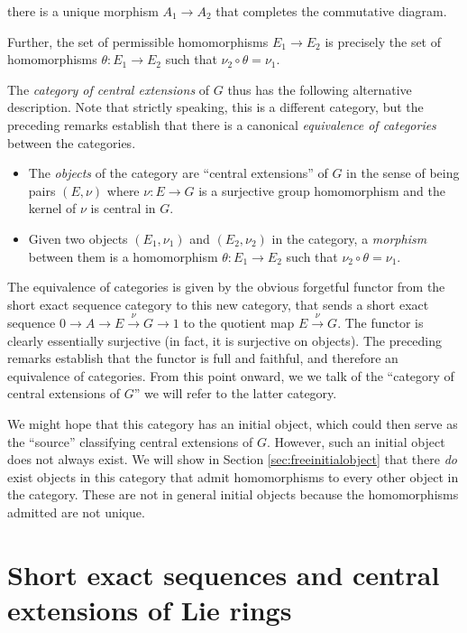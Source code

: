 there is a unique morphism $A_1 \to A_2$ that completes the
commutative diagram.

Further, the set of permissible homomorphisms
$E_1 \to E_2$ is precisely the set of homomorphisms $\theta: E_1 \to
E_2$ such that $\nu_2 \circ \theta = \nu_1$.

The {\em category of central extensions} of $G$ thus has the following
alternative description. Note that strictly speaking, this is a
different category, but the preceding remarks establish that there is
a canonical {\em equivalence of categories} between the categories.

\begin{itemize}
\item The {\em objects} of the category are ``central extensions'' of
  $G$ in the sense of being pairs $(E,\nu)$ where $\nu:E \to G$ is a
  surjective group homomorphism and the kernel of $\nu$ is central in $G$.
\item Given two objects $(E_1,\nu_1)$ and $(E_2,\nu_2)$ in the
  category, a {\em morphism} between them is a homomorphism $\theta:
  E_1 \to E_2$ such that $\nu_2 \circ \theta = \nu_1$.
\end{itemize}

The equivalence of categories is given by the obvious forgetful
functor from the short exact sequence category to this new category,
that sends a short exact sequence $0 \to A \to E \stackrel{\nu}{\to} G
\to 1$ to the quotient map $E \stackrel{\nu}{\to} G$. The functor is
clearly essentially surjective (in fact, it is surjective on
objects). The preceding remarks establish that the functor is full and
faithful, and therefore an equivalence of categories. From this point
onward, we we talk of the ``category of central extensions of $G$'' we
will refer to the latter category.

We might hope that this category has an initial object, which could
then serve as the ``source'' classifying central extensions of
$G$. However, such an initial object does not always exist. We will
show in Section \ref{sec:freeinitialobject} that there {\em do} exist
objects in this category that admit homomorphisms to every other
object in the category. These are not in general initial objects
because the homomorphisms admitted are not unique.


\section{Short exact sequences and central extensions of Lie rings}\label{sec:ses-lie}

